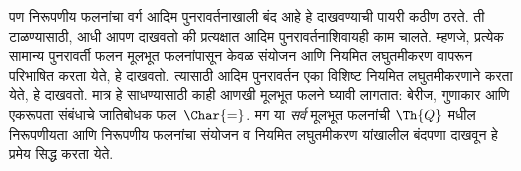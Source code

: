 \documentclass[../../../include/open-logic-section]{subfiles}
\begin{document}
पण निरूपणीय फलनांचा वर्ग आदिम पुनरावर्तनाखाली बंद आहे हे दाखवण्याची
पायरी कठीण ठरते. ती टाळण्यासाठी, आधी आपण दाखवतो की प्रत्यक्षात
आदिम पुनरावर्तनाशिवायही काम चालते. म्हणजे, प्रत्येक सामान्य
पुनरावर्ती फलन मूलभूत फलनांपासून केवळ संयोजन आणि नियमित
लघुतमीकरण वापरून परिभाषित करता येते, हे दाखवतो. त्यासाठी आदिम
पुनरावर्तन एका विशिष्ट नियमित लघुतमीकरणाने करता येते, हे दाखवतो.
मात्र हे साधण्यासाठी काही आणखी मूलभूत फलने घ्यावी लागतात:
बेरीज, गुणाकार आणि एकरूपता संबंधाचे जातिबोधक फल~$\Char{=}$. मग
या \emph{सर्व} मूलभूत फलनांची $\Th{Q}$ मधील निरूपणीयता आणि
निरूपणीय फलनांचा संयोजन व नियमित लघुतमीकरण यांखालील बंदपणा
दाखवून हे प्रमेय सिद्ध करता येते.
\end{document}

